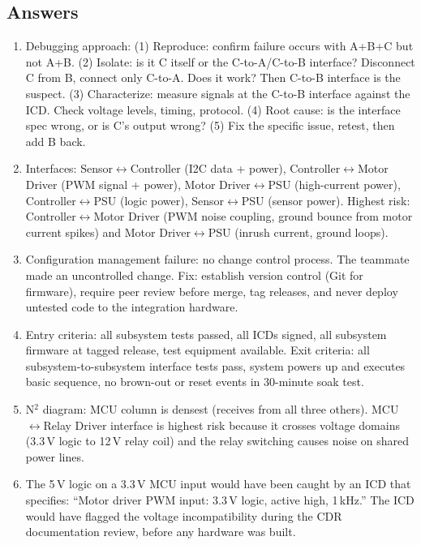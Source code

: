 \subsection{Answers}
\begin{enumerate}[leftmargin=1.5em]
\item Debugging approach: (1) Reproduce: confirm failure occurs with A+B+C but not A+B. (2) Isolate: is it C itself or the C-to-A/C-to-B interface? Disconnect C from B, connect only C-to-A. Does it work? Then C-to-B interface is the suspect. (3) Characterize: measure signals at the C-to-B interface against the ICD. Check voltage levels, timing, protocol. (4) Root cause: is the interface spec wrong, or is C's output wrong? (5) Fix the specific issue, retest, then add B back.
\item Interfaces: Sensor$\leftrightarrow$Controller (I2C data + power), Controller$\leftrightarrow$Motor Driver (PWM signal + power), Motor Driver$\leftrightarrow$PSU (high-current power), Controller$\leftrightarrow$PSU (logic power), Sensor$\leftrightarrow$PSU (sensor power). Highest risk: Controller$\leftrightarrow$Motor Driver (PWM noise coupling, ground bounce from motor current spikes) and Motor Driver$\leftrightarrow$PSU (inrush current, ground loops).
\item Configuration management failure: no change control process. The teammate made an uncontrolled change. Fix: establish version control (Git for firmware), require peer review before merge, tag releases, and never deploy untested code to the integration hardware.
\item Entry criteria: all subsystem tests passed, all ICDs signed, all subsystem firmware at tagged release, test equipment available. Exit criteria: all subsystem-to-subsystem interface tests pass, system powers up and executes basic sequence, no brown-out or reset events in 30-minute soak test.
\item N$^2$ diagram: MCU column is densest (receives from all three others). MCU$\leftrightarrow$Relay Driver interface is highest risk because it crosses voltage domains (3.3\,V logic to 12\,V relay coil) and the relay switching causes noise on shared power lines.
\item The 5\,V logic on a 3.3\,V MCU input would have been caught by an ICD that specifies: ``Motor driver PWM input: 3.3\,V logic, active high, 1\,kHz.'' The ICD would have flagged the voltage incompatibility during the CDR documentation review, before any hardware was built.
\end{enumerate}


